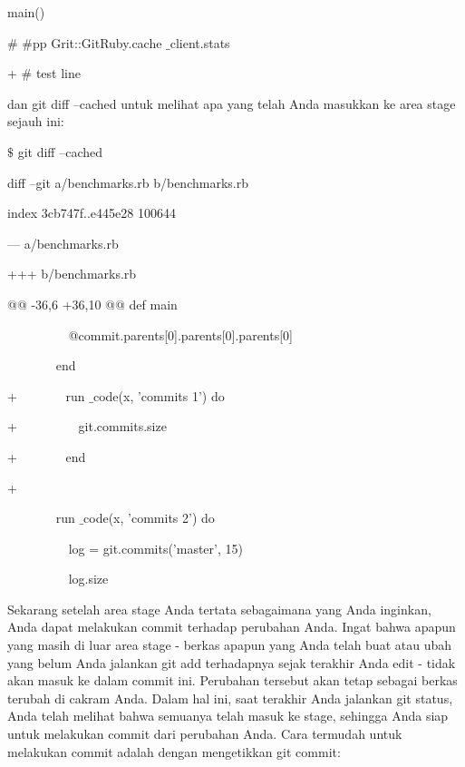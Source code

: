 \noindent 
 main() \par
\vspace{12pt}
\noindent 
  $  \#  $ $  \#  $pp Grit::GitRuby.cache $  \_  $client.stats  \par
\noindent 
+ $  \#  $ test line \par
\vspace{12pt}
\noindent 
dan git diff --cached untuk melihat apa yang telah Anda masukkan ke area stage sejauh ini: \par
\vspace{12pt}
\noindent 
 $  \$  $ git diff --cached \par
\noindent 
diff --git a/benchmarks.rb b/benchmarks.rb \par
\noindent 
index 3cb747f..e445e28 100644 \par
\noindent 
--- a/benchmarks.rb \par
\noindent 
+++ b/benchmarks.rb \par
\noindent 
@@ -36,6 +36,10 @@ def main \par
\noindent 
~~~~~~~~~ @commit.parents[0].parents[0].parents[0] \par
\noindent 
~~~~~~~ end \par
\vspace{12pt}
\noindent 
+~~~~~~~ run $  \_  $code(x, 'commits 1') do \par
\noindent 
+~~~~~~~~~ git.commits.size \par
\noindent 
+~~~~~~~ end \par
\noindent 
+~~~~~~~~~~~~~  \par
\noindent 
~~~~~~~ run $  \_  $code(x, 'commits 2') do \par
\noindent 
~~~~~~~~~ log = git.commits('master', 15) \par
\noindent 
~~~~~~~~~ log.size \par
\vspace{12pt}
\vspace{12pt}
\noindent 
Sekarang setelah area stage Anda tertata sebagaimana yang Anda inginkan, Anda dapat melakukan commit terhadap perubahan Anda. Ingat bahwa apapun yang masih di luar area stage - berkas apapun yang Anda telah buat atau ubah yang belum Anda jalankan git add terhadapnya sejak terakhir Anda edit - tidak akan masuk ke dalam commit ini. Perubahan tersebut akan tetap sebagai berkas terubah di cakram Anda. Dalam hal ini, saat terakhir Anda jalankan git status, Anda telah melihat bahwa semuanya telah masuk ke stage, sehingga Anda siap untuk melakukan commit dari perubahan Anda. Cara termudah untuk melakukan commit adalah dengan mengetikkan git commit: \par
